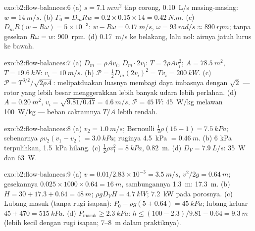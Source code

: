 \begin{solution}{exo:b2:flow-balances:6}
(a) $s = \qty{7.1}{mm^2}$ tiap corong, \qty{0.10}{L/s} masing-masing: $w = \qty{14}{m/s}$. (b)
$\Gamma_0 = D_mRw = 0.2 \times 0.15 \times 14 = \qty{0.42}{N.m}$. (c) $D_mR(w - R\omega) =
5 \times 10^{-3}$: $w - R\omega = \qty{0.17}{m/s}$, $\omega = \qty{93}{rad/s} \approx \qty{890}{rpm}$;
tanpa gesekan $R\omega = w$: \qty{900}{rpm}. (d) \qty{0.17}{m/s} ke belakang, lalu
nol: airnya jatuh lurus ke bawah.
\end{solution}

\begin{solution}{exo:b2:flow-balances:7}
(a) $D_m = \rho Av_i$,  $D_m\cdot2v_i$: $T = 2\rho Av_i^2$; $A = \qty{78.5}{m^2}$,
$T = \qty{19.6}{kN}$: $v_i = \qty{10}{m/s}$. (b) $\mathcal P = \tfrac12D_m(2v_i)^2 = Tv_i =
\qty{200}{kW}$. (c) $\mathcal P = T^{3/2}/\sqrt{2\rho A}$: melipatduakan luasnya
membagi daya imbasnya dengan $\sqrt2$ --- rotor yang lebih besar menggerakkan lebih banyak udara
lebih perlahan. (d) $A = \qty{0.20}{m^2}$, $v_i = \sqrt{9.81/0.47} = \qty{4.6}{m/s}$, $\mathcal P
= \qty{45}{W}$: \qty{45}{W/kg} melawan \qty{100}{W/kg} --- beban cakramnya $T/A$
lebih rendah.
\end{solution}

\begin{solution}{exo:b2:flow-balances:8}
(a) $v_2 = \qty{1.0}{m/s}$; Bernoulli $\tfrac12\rho(16 - 1) = \qty{7.5}{kPa}$; sebenarnya
$\rho v_2(v_1 - v_2) = \qty{3.0}{kPa}$; ruginya \qty{4.5}{kPa} $= \qty{0.46}{m}$. (b) $6$ kPa
terpulihkan, \qty{1.5}{kPa} hilang. (c) $\tfrac12\rho v_1^2 = \qty{8}{kPa}$, \qty{0.82}{m}. (d)
$D_V = \qty{7.9}{L/s}$: \qty{35}{W} dan \qty{63}{W}.
\end{solution}

\begin{solution}{exo:b2:flow-balances:9}
(a) $v = 0.01/2.83 \times 10^{-3} = \qty{3.5}{m/s}$, $v^2/2g = \qty{0.64}{m}$; gesekannya
$0.025 \times 1000 \times 0.64 = \qty{16}{m}$, sambungannya \qty{1.3}{m}: \qty{17.3}{m}. (b)
$H = 30 + 17.3 + 0.64 = \qty{48}{m}$; $\rho gD_VH = \qty{4.7}{kW}$; \qty{7.2}{kW} pada
porosnya. (c) Lubang masuk (tanpa rugi isapan): $P_0 - \rho g(5 + 0.64) = \qty{45}{kPa}$;
lubang keluar $45 + 470 = \qty{515}{kPa}$. (d) $P_{\text{masuk}} \ge \qty{2.3}{kPa}$: $h \le (100 -
2.3)/9.81 - 0.64 = \qty{9.3}{m}$ (lebih kecil dengan rugi isapan; $7$--\qty{8}{m} dalam
praktiknya).
\end{solution}

